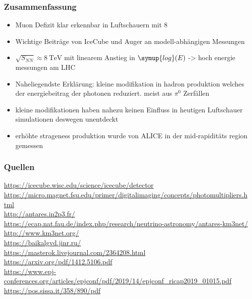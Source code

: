 \documentclass[aspectratio=1610, 9pt]{beamer}
\begin{document}

\begin{frame}\frametitle{Zusammenfassung}
  \begin{itemize}
    \item Muon Defizit klar erkennbar in Luftschauern mit 8\sigma
    \item Wichtige Beitr\"age von IceCube und Auger an modell-abh\"angigen Messungen
    \item $\sqrt{S_{NN}} \approx \SI{8}{\tera\electronvolt}$ mit linearem Anstieg in $\symup{log}(E)$ -> hoch energie messungen am LHC
    \item Naheliegendste Erkl\"arung: kleine modifikation in hadron produktion welches der energiebeitrag der photonen reduziert. meist aus $\pi^{0}$ Zerf\"allen
    \item kleine modifikationen haben nahezu keinen Einfluss in heutigen Luftschauer simulationen deswegen unentdeckt
    \item erh\"ohte strageness produktion wurde von ALICE in der mid-rapidit\"ats region gemessen
  \end{itemize}
\end{frame}

\begin{frame}\frametitle{Quellen}
\url{https://icecube.wisc.edu/science/icecube/detector} \\
\url{https://micro.magnet.fsu.edu/primer/digitalimaging/concepts/photomultipliers.html} \\
\url{http://antares.in2p3.fr/} \\
\url{https://ecap.nat.fau.de/index.php/research/neutrino-astronomy/antares-km3net/} \\
\url{http://www.km3net.org/} \\
\url{https://baikalgvd.jinr.ru/} \\
\url{https://masterok.livejournal.com/2364208.html} \\
\url{https://arxiv.org/pdf/1412.5106.pdf} \\
\url{https://www.epj-conferences.org/articles/epjconf/pdf/2019/14/epjconf_ricap2019_01015.pdf} \\
\url{https://pos.sissa.it/358/890/pdf} \\
\end{frame}
\end{document}
